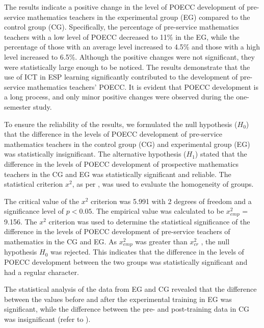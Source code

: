 The results indicate a positive change in the level of POECC development
of pre-service mathematics teachers in the experimental group (EG)
compared to the control group (CG). Specifically, the percentage of
pre-service mathematics teachers with a low level of POECC decreased to
11\% in the EG, while the percentage of those with an average level
increased to 4.5\% and those with a high level increased to 6.5\%.
Although the positive changes were not significant, they were
statistically large enough to be noticed. The results demonstrate that
the use of ICT in ESP learning significantly contributed to the
development of pre-service mathematics teachers' POECC. It is evident
that POECC development is a long process, and only minor positive
changes were observed during the one-semester study.
	
To ensure the reliability of the results, we formulated the null
hypothesis ($H_0$) that the difference in the
levels of POECC development of pre-service mathematics teachers in the
control group (CG) and experimental group (EG) was statistically
insignificant. The alternative hypothesis
($H_1$) stated that the difference in the
levels of POECC development of prospective mathematics teachers in the
CG and EG was statistically significant and reliable. The statistical
criterion $x^{2}$, as per , was used to evaluate the homogeneity of groups.
	
The critical value of the $x^{2}$ criterion was 5.991 with 2 degrees of freedom
and a significance level of $p < 0.05$. The empirical
value was calculated to be $x_{emp}^{2}$ = 9.156. The $x^{2}$ criterion was used to determine
the statistical significance of the difference in the levels of POECC
development of pre-service teachers of mathematics in the CG and EG. As
$x_{emp}^{2}$ was greater than $x_{cr}^{2}$ , the null hypothesis $H_0$ was
rejected. This indicates that the difference in the levels of POECC
development between the two groups was statistically significant and had
a regular character.

The statistical analysis of the data from EG and CG revealed that the
difference between the values before and after the experimental training
in EG was significant, while the difference between the pre- and
post-training data in CG was insignificant (refer to ).
	
